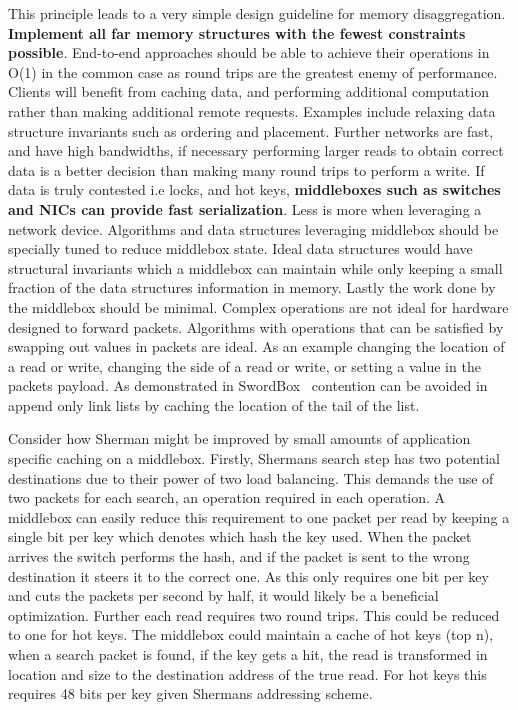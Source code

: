 This principle leads to a very simple design guideline for memory
disaggregation. \textbf{Implement all far memory structures with the fewest
constraints possible}. End-to-end approaches should be able to achieve their
operations in O(1) in the common case as round trips are the greatest enemy of
performance.  Clients will benefit from caching data, and performing additional
computation rather than making additional remote requests. Examples include
relaxing data structure invariants such as ordering and placement. Further
networks are fast, and have high bandwidths, if necessary performing larger
reads to obtain correct data is a better decision than making many round trips
to perform a write. If data is truly contested i.e locks, and hot keys,
\textbf{middleboxes such as switches and NICs can provide fast serialization}.
Less is more when leveraging a network device. Algorithms and data structures
leveraging middlebox should be specially tuned to reduce middlebox state. Ideal
data structures would have structural invariants which a middlebox can maintain
while only keeping a small fraction of the data structures information in
memory. Lastly the work done by the middlebox should be minimal. Complex
operations are not ideal for hardware designed to forward packets. Algorithms
with operations that can be satisfied by swapping out values in packets are
ideal. As an example changing the location of a read or write, changing the side
of a read or write, or setting a value in the packets payload. As demonstrated
in SwordBox~\cite{Grant2021InContRes} contention can be avoided in append only
link lists by caching the location of the tail of the list.


Consider how Sherman might be improved by small amounts of application specific
caching on a middlebox. Firstly, Shermans search step has two potential
destinations due to their power of two load balancing. This demands the use of
two packets for each search, an operation required in each operation. A
middlebox can easily reduce this requirement to one packet per read by keeping a
single bit per key which denotes which hash the key used. When the packet
arrives the switch performs the hash, and if the packet is sent to the wrong
destination it steers it to the correct one. As this only requires one bit per
key and cuts the packets per second by half, it would likely be a beneficial
optimization. Further each read requires two round trips. This could be reduced
to one for hot keys. The middlebox could maintain a cache of hot keys (top n),
when a search packet is found, if the key gets a hit, the read is transformed in
location and size to the destination address of the true read. For hot keys this
requires 48 bits per key given Shermans addressing scheme.


